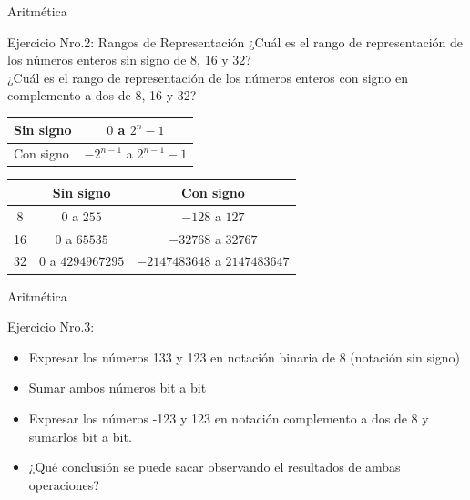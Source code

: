 \documentclass[usenames,table,dvipsnames,aspectratio=169]{beamer}
\begin{document}
\begin{frame}[t]{Aritmética}
  \begin{block}{Ejercicio Nro.2: Rangos de Representación}
  ¿Cuál es el rango de representación de los números enteros sin signo de 8, 16 y \SI{32}{\bit}?\\
  ¿Cuál es el rango de representación de los números enteros con signo en complemento a dos de 8, 16 y \SI{32}{\bit}?
  \end{block}
  \pause
  \begin{center}
  \begin{tabular}{l|c}
  Sin signo & $0$ a $2^{n}-1$        \\ \hline
  Con signo & $-2^{n-1}$ a $2^{n-1}-1$ \\
  \end{tabular}
  \end{center}
  \begin{center}
  \begin{tabular}{c|c|c}
   & Sin signo & Con signo \\ \hline
    8  & $0$ a $255$         & $-128$ a $127$               \\ \hline
    16 & $0$ a $65535$       & $-32768$ a $32767$           \\ \hline
    32 & $0$ a $4294967295$  & $-2147483648$ a $2147483647$ \\ 
  \end{tabular}
  \end{center}
\end{frame}

\begin{frame}[t,fragile]{Aritmética}
  \begin{block}{Ejercicio Nro.3:}
  \begin{itemize}[<+(1)->]
   \justifying
   \item Expresar los números 133 y 123 en notación binaria de \SI{8}{\bit} (notación sin signo)
   \item Sumar ambos números bit a bit
   \item Expresar los números -123 y 123 en notación complemento a dos de \SI{8}{\bit} y sumarlos bit a bit.
   \item ¿Qué conclusión se puede sacar observando el resultados de ambas operaciones?
  \end{itemize}
  \end{block}
\end{frame}
\end{document}
